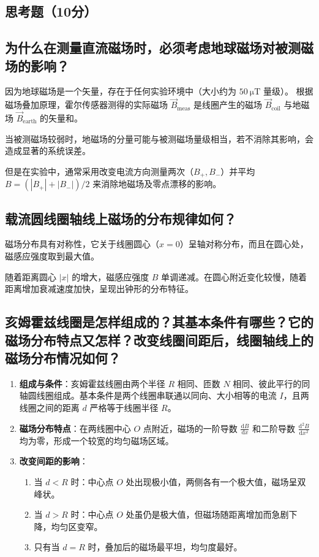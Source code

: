 \documentclass{../../templates/Report}%
\begin{document}
\begin{fullreportonly}
    \section{思考题（10分）}

    \subsection{为什么在测量直流磁场时，必须考虑地球磁场对被测磁场的影响？}
    因为地球磁场是一个矢量，存在于任何实验环境中（大小约为 $\SI{50}{\micro\tesla}$ 量级）。
    根据磁场叠加原理，霍尔传感器测得的实际磁场 $\vec{B}_{\text{meas}}$ 是线圈产生的磁场 $\vec{B}_{\text{coil}}$ 与地磁场 $\vec{B}_{\text{earth}}$ 的矢量和。

    当被测磁场较弱时，地磁场的分量可能与被测磁场量级相当，若不消除其影响，会造成显著的系统误差。

    但是在实验中，通常采用改变电流方向测量两次（$B_+, B_-$）并平均 $B = (|B_+| + |B_-|)/2$ 来消除地磁场及零点漂移的影响。

    \subsection{载流圆线圈轴线上磁场的分布规律如何？}
    磁场分布具有对称性，它关于线圈圆心（$x=0$）呈轴对称分布，而且在圆心处，磁感应强度取到最大值。

    随着距离圆心 $|x|$ 的增大，磁感应强度 $B$ 单调递减。在圆心附近变化较慢，随着距离增加衰减速度加快，呈现出钟形的分布特征。

    \subsection{亥姆霍兹线圈是怎样组成的？其基本条件有哪些？它的磁场分布特点又怎样？改变线圈间距后，线圈轴线上的磁场分布情况如何？}
    \begin{enumerate}
        \item \textbf{组成与条件}：亥姆霍兹线圈由两个半径 $R$ 相同、匝数 $N$ 相同、彼此平行的同轴圆线圈组成。基本条件是两个线圈串联通以同向、大小相等的电流 $I$，且两线圈之间的距离 $d$ 严格等于线圈半径 $R$。
        \item \textbf{磁场分布特点}：在两线圈中心 $O$ 点附近，磁场的一阶导数 $\frac{\textrm{d}B}{\textrm{d}x}$ 和二阶导数 $\frac{\textrm{d}^2B}{\textrm{d}x^2}$ 均为零，形成一个较宽的均匀磁场区域。
        \item \textbf{改变间距的影响}：
              \begin{enumerate}
                  \item 当 $d < R$ 时：中心点 $O$ 处出现极小值，两侧各有一个极大值，磁场呈双峰状。
                  \item 当 $d > R$ 时：中心点 $O$ 处虽仍是极大值，但磁场随距离增加而急剧下降，均匀区变窄。
                  \item 只有当 $d = R$ 时，叠加后的磁场最平坦，均匀度最好。
              \end{enumerate}
    \end{enumerate}


\end{fullreportonly}
\end{document}
